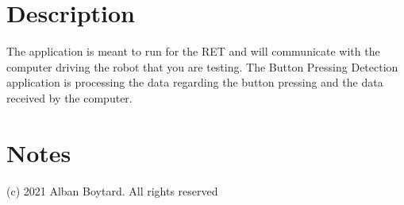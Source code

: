 \hypertarget{index_description_main}{}\section{Description}\label{index_description_main}
The application is meant to run for the R\+ET and will communicate with the computer driving the robot that you are testing. The Button Pressing Detection application is processing the data regarding the button pressing and the data received by the computer. \hypertarget{index_notes_main}{}\section{Notes}\label{index_notes_main}
(c) 2021 Alban Boytard. All rights reserved 